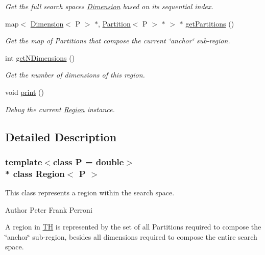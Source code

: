 \begin{DoxyCompactItemize}
\begin{DoxyCompactList}\small\item\em Get the full search space\textquotesingle{}s \hyperlink{classDimension}{Dimension} based on its sequential index. \end{DoxyCompactList}\item 
map$<$ \hyperlink{classDimension}{Dimension}$<$ P $>$ $\ast$, \hyperlink{classPartition}{Partition}$<$ P $>$ $\ast$ $>$ $\ast$ \hyperlink{classRegion_a07c792e7ab2768254d71a0b688ccd935}{get\+Partitions} ()
\begin{DoxyCompactList}\small\item\em Get the map of Partitions that compose the current \char`\"{}anchor\char`\"{} sub-\/region. \end{DoxyCompactList}\item 
int \hyperlink{classRegion_aca2bc6ee7453d59523771c4defc7c7d0}{get\+N\+Dimensions} ()
\begin{DoxyCompactList}\small\item\em Get the number of dimensions of this region. \end{DoxyCompactList}\item 
void \hyperlink{classRegion_a762d4587205ba6bed49660ae1359a4a6}{print} ()
\begin{DoxyCompactList}\small\item\em Debug the current \hyperlink{classRegion}{Region} instance. \end{DoxyCompactList}\end{DoxyCompactItemize}


\subsection{Detailed Description}
\subsubsection*{template$<$class P = double$>$\\*
class Region$<$ P $>$}

This class represents a region within the search space. 

\begin{DoxyAuthor}{Author}
Peter Frank Perroni
\end{DoxyAuthor}
A region in \hyperlink{classTH}{TH} is represented by the set of all Partitions required to compose the \char`\"{}anchor\char`\"{} sub-\/region, besides all dimensions required to compose the entire search space. 

